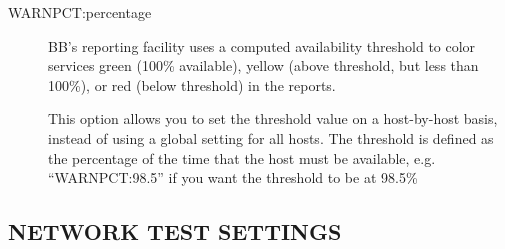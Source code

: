 \begin{description}
 

\item[WARNPCT:percentage] BB's reporting facility uses a computed
  availability threshold to color services green (100\% available),
  yellow (above threshold, but less than 100\%), or red (below
  threshold) in the reports. 


  This option allows you to set the threshold value on a host-by-host
  basis, instead of using a global setting for all hosts. The
  threshold is defined as the percentage of the time that the host
  must be available, e.g. ``WARNPCT:98.5'' if you want the threshold
  to be at 98.5\% 



 

\end{description}

\subsection{NETWORK TEST SETTINGS}
